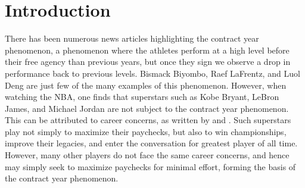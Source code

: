 \documentclass[12pt]{article}
\begin{document}
	\tableofcontents
	
	\clearpage
	
	\doublespacing
	
	
	\section{Introduction} \label{sec:introduction}
	There has been numerous news articles highlighting the contract year phenomenon, a phenomenon where the athletes perform at a high level before their free agency than previous years, but once they sign we observe a drop in performance back to previous levels. Bismack Biyombo, Raef LaFrentz, and Luol Deng are just few of the many examples of this phenomenon. However, when watching the NBA, one finds that superstars such as Kobe Bryant, LeBron James, and Michael Jordan are not subject to the contract year phenomenon. This can be attributed to career concerns, as written by \cite{holmstrom_contracts_1999} and \cite{gibbons_1992}. Such superstars play not simply to maximize their paychecks, but also to win championships, improve their legacies, and enter the conversation for greatest player of all time. However, many other players do not face the same career concerns, and hence may simply seek to maximize paychecks for minimal effort, forming the basis of the contract year phenomenon.
	
\end{document}
